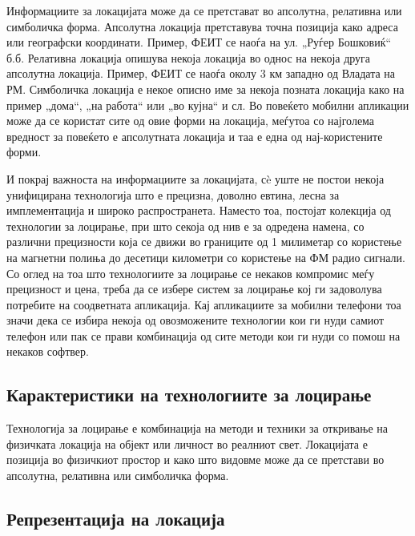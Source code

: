 Информациите за локацијата може да се претстават во апсолутна, релативна или
симболичка форма. Апсолутна локација претставува точна позиција како адреса или
географски координати. Пример, ФЕИТ се наоѓа на ул. „Руѓер Бошковиќ“ б.б.
Релативна локација опишува некоја локација во однос на некоја друга апсолутна
локација. Пример, ФЕИТ се наоѓа околу 3 км западно од Владата на РМ. Симболичка
локација е некое описно име за некоја позната локација како на пример „дома“,
„на работа“ или „во кујна“ и сл. Во повеќето мобилни апликации може да се
користат сите од овие форми на локација, меѓутоа со најголема вредност за
повеќето е апсолутната локација и таа е една од нај-користените форми.

И покрај важноста на информациите за локацијата, сè уште не постои некоја
унифицирана технологија што е прецизна, доволно евтина, лесна за имплементација
и широко распространета. Наместо тоа, постојат колекција од технологии за
лоцирање, при што секоја од нив е за одредена намена, со различни прецизности
која се движи во границите од 1 милиметар со користење на магнетни полиња до
десетици километри со користење на ФМ радио сигнали. Со оглед на тоа што
технологиите за лоцирање се некаков компромис меѓу прецизност и цена, треба да
се избере систем за лоцирање кој ги задоволува потребите на соодветната
апликација. Кај апликациите за мобилни телефони тоа значи дека се избира некоја
од овозможените технологии кои ги нуди самиот телефон или пак се прави
комбинација од сите методи кои ги нуди со помош на некаков софтвер.

\subsection{Карактеристики на технологиите за лоцирање} 

Технологија за лоцирање е комбинација на методи и техники за откривање на
физичката локација на објект или личност во реалниот свет. Локацијата е позиција
во физичкиот простор и како што видовме може да се претстави во апсолутна,
релативна или симболичка форма.

\subsection{Репрезентација на локација} 

